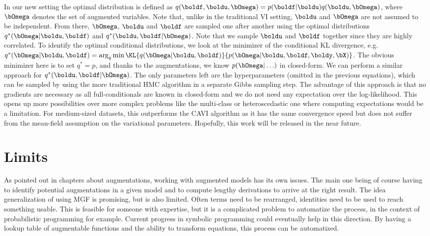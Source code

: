 In our new setting the optimal distribution is defined as $q(\boldf,\boldu,\bOmega) = p(\boldf|\boldu)q(\boldu, \bOmega)$, where $\bOmega$ denotes the set of augmented variables.
Note that, unlike in the traditional \ac{VI} setting, $\boldu$ and $\bOmega$ are not assumed to be independent.
From there, $\bOmega$, $\boldu$ and $\boldf$ are sampled one after another using the optimal distributions $q^*(\bOmega|\boldu,\boldf)$ and $q^*(\boldu,\boldf|\bOmega)$.
Note that we sample $\boldu$ and $\boldf$ together since they are highly correlated.
To identify the optimal conditional distributions, we look at the minimizer of the conditional \ac{KL} divergence, e.g. $q^*(\bOmega|\boldu,\boldf) = \arg_{q} \min \KL{q(\bOmega|\boldu,\boldf)}{p(\bOmega|\boldu,\boldf,\boldy,\bX)}$.
The obvious minimizer here is to set $q^*=p$, and thanks to the augmentations, we know $p(\bOmega|\ldots)$ in closed-form.
We can perform a similar approach for $q^*(\boldu,\boldf|\bOmega)$.
The only parameters left are the hyperparameters (omitted in the previous equations), which can be sampled by using the more traditional \ac{HMC} algorithm in a separate Gibbs sampling step.
The advantage of this approach is that no gradients are necessary as all full-conditionals are known in closed-form and we do not need any expectation over the log-likelihood.
This opens up more possibilities over more complex problems like the multi-class or heteroscedastic one where computing expectations would be a limitation.
For medium-sized datasets, this outperforms the \ac{CAVI} algorithm as it has the same convergence speed but does not suffer from the mean-field assumption on the variational parameters.
Hopefully, this work will be released in the near future.

\section{Limits}

As pointed out in chapters about augmentations, working with augmented models has its own issues.
The main one being of course having to identify potential augmentations in a given model and to compute lengthy derivations to arrive at the right result.
The idea generalization of using \ac{MGF} is promising, but is also limited.
Often terms need to be rearranged, identities need to be used to reach something usable.
This is feasible for someone with expertise, but it is a complicated problem to automatize the process, in the context of probabilistic programming for example.
Current progress in symbolic programming could eventually help in this direction.
By having a lookup table of augmentable functions and the ability to transform equations, this process can be automatized.

